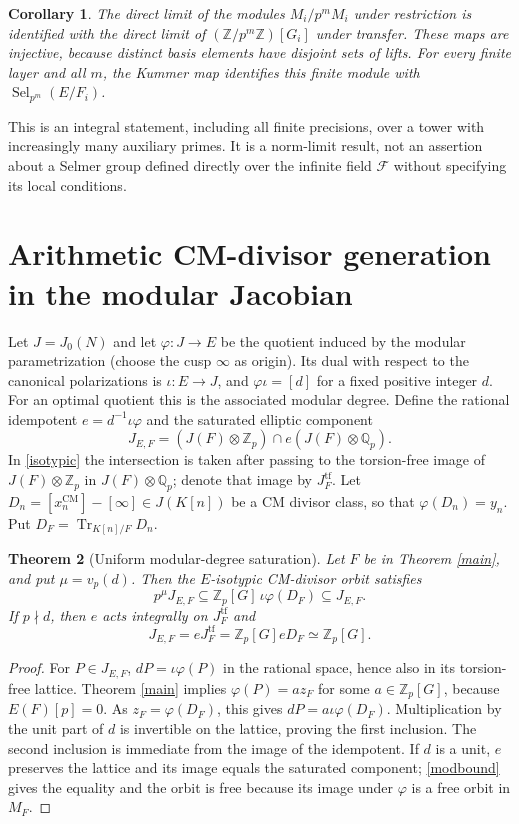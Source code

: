 \documentclass[11pt,a4paper]{article}
\newtheorem{theorem}{Theorem}[section]\newtheorem{proposition}[theorem]{Proposition}\newtheorem{lemma}[theorem]{Lemma}\newtheorem{corollary}[theorem]{Corollary}\theoremstyle{definition}\newtheorem{definition}[theorem]{Definition}\theoremstyle{remark}\newtheorem{remark}[theorem]{Remark}
\newcommand{\Zp}{\mathbb Z_p}\newcommand{\Qp}{\mathbb Q_p}\newcommand{\Fp}{\mathbb F_p}\newcommand{\Q}{\mathbb Q}\newcommand{\Sha}{\operatorname{Sha}}\newcommand{\Sel}{\operatorname{Sel}}\newcommand{\Gal}{\operatorname{Gal}}\newcommand{\Tr}{\operatorname{Tr}}\newcommand{\rk}{\operatorname{rank}}\newcommand{\ord}{\operatorname{ord}}\newcommand{\Hom}{\operatorname{Hom}}\newcommand{\SL}{\operatorname{SL}}\newcommand{\GL}{\operatorname{GL}}\newcommand{\coker}{\operatorname{coker}}\newcommand{\length}{\operatorname{length}}\newcommand{\res}{\operatorname{res}}\newcommand{\cor}{\operatorname{cor}}\newcommand{\Id}{\operatorname{id}}
\numberwithin{equation}{section}
\begin{document}
\begin{corollary}
The direct limit of the modules $M_i/p^m M_i$ under restriction is identified with the direct limit of $(\mathbb Z/p^m\mathbb Z)[G_i]$ under transfer. These maps are injective, because distinct basis elements have disjoint sets of lifts. For every finite layer and all $m$, the Kummer map identifies this finite module with $\Sel_{p^m}(E/F_i)$.
\end{corollary}
\noindent This is an integral statement, including all finite precisions, over a tower with increasingly many auxiliary primes. It is a norm-limit result, not an assertion about a Selmer group defined directly over the infinite field $\mathcal F$ without specifying its local conditions.
\section{Arithmetic CM-divisor generation in the modular Jacobian}\label{jac}
Let $J=J_0(N)$ and let $\varphi:J\to E$ be the quotient induced by the modular parametrization (choose the cusp $\infty$ as origin). Its dual with respect to the canonical polarizations is $\iota:E\to J$, and $\varphi\iota=[d]$ for a fixed positive integer $d$. For an optimal quotient this is the associated modular degree. Define the rational idempotent $e=d^{-1}\iota\varphi$ and the saturated elliptic component
\begin{equation}\label{isotypic}
J_{E,F}=(J(F)\otimes\Zp)\cap e(J(F)\otimes\Qp).
\end{equation}
In \eqref{isotypic} the intersection is taken after passing to the torsion-free image of $J(F)\otimes\Zp$ in $J(F)\otimes\Qp$; denote that image by $J_F^{\mathrm{tf}}$. Let $D_n=[x_n^{\mathrm{CM}}]-[\infty]\in J(K[n])$ be a CM divisor class, so that $\varphi(D_n)=y_n$. Put $D_F=\Tr_{K[n]/F}D_n$.
\begin{theorem}[Uniform modular-degree saturation]\label{moddeg}
Let $F$ be in Theorem \ref{main}, and put $\mu=v_p(d)$. Then the $E$-isotypic CM-divisor orbit satisfies
\begin{equation}\label{modbound}
p^\mu J_{E,F}\subseteq \Zp[G]\,\iota\varphi(D_F)\subseteq J_{E,F}.
\end{equation}
If $p\nmid d$, then $e$ acts integrally on $J_F^{\mathrm{tf}}$ and
\[ J_{E,F}=eJ_F^{\mathrm{tf}}=\Zp[G]eD_F\simeq\Zp[G]. \]
\end{theorem}
\begin{proof}
For $P\in J_{E,F}$, $dP=\iota\varphi(P)$ in the rational space, hence also in its torsion-free lattice. Theorem \ref{main} implies $\varphi(P)=az_F$ for some $a\in\Zp[G]$, because $E(F)[p]=0$. As $z_F=\varphi(D_F)$, this gives $dP=a\iota\varphi(D_F)$. Multiplication by the unit part of $d$ is invertible on the lattice, proving the first inclusion. The second inclusion is immediate from the image of the idempotent. If $d$ is a unit, $e$ preserves the lattice and its image equals the saturated component; \eqref{modbound} gives the equality and the orbit is free because its image under $\varphi$ is a free orbit in $M_F$.
\end{proof}
\end{document}
